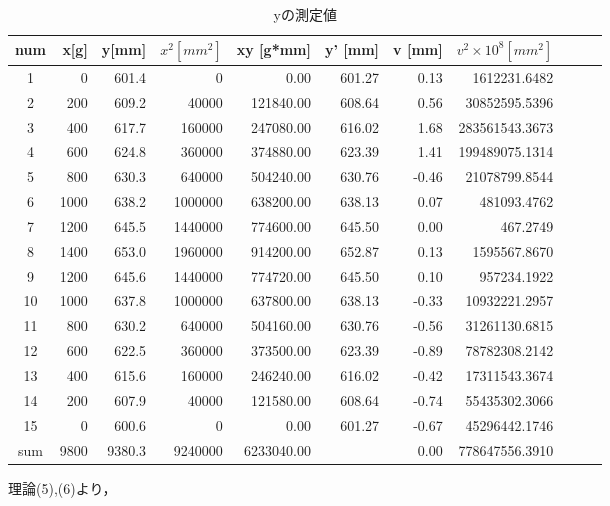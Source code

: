 \documentclass[a4paper,1pt]{jsarticle}
\begin{document}
\begin{table}[H]
  \caption{yの測定値}
  \label{table:SpeedOfLight}
  \centering
  \begin{tabular}{|c||r|r|r|r|r|r|r|r|r|r|}
    \hline
    num & x[g] & y[mm] & $x^2 [mm^2]$ & xy [g*mm] & y' [mm] & v [mm] & $v^2\times10^8 [mm^2]$ \\
    \hline\hline
    1 & 0 & 601.4 & 0 & 0.00 & 601.27 & 0.13 & 1612231.6482 \\
    2 & 200 & 609.2 & 40000 & 121840.00 & 608.64 & 0.56 & 30852595.5396 \\
    3 & 400 & 617.7 & 160000 & 247080.00 & 616.02 & 1.68 & 283561543.3673 \\
    4 & 600 & 624.8 & 360000 & 374880.00 & 623.39 & 1.41 & 199489075.1314 \\
    5 & 800 & 630.3 & 640000 & 504240.00 & 630.76 & -0.46 & 21078799.8544 \\
    6 & 1000 & 638.2 & 1000000 & 638200.00 & 638.13 & 0.07 & 481093.4762 \\
    7 & 1200 & 645.5 & 1440000 & 774600.00 & 645.50 & 0.00 & 467.2749 \\
    8 & 1400 & 653.0 & 1960000 & 914200.00 & 652.87 & 0.13 & 1595567.8670 \\
    9 & 1200 & 645.6 & 1440000 & 774720.00 & 645.50 & 0.10 & 957234.1922 \\
    10 & 1000 & 637.8 & 1000000 & 637800.00 & 638.13 & -0.33 & 10932221.2957 \\
    11 & 800 & 630.2 & 640000 & 504160.00 & 630.76 & -0.56 & 31261130.6815 \\
    12 & 600 & 622.5 & 360000 & 373500.00 & 623.39 & -0.89 & 78782308.2142 \\
    13 & 400 & 615.6 & 160000 & 246240.00 & 616.02 & -0.42 & 17311543.3674 \\
    14 & 200 & 607.9 & 40000 & 121580.00 & 608.64 & -0.74 & 55435302.3066 \\
    15 & 0 & 600.6 & 0 & 0.00 & 601.27 & -0.67 & 45296442.1746 \\

    \hline\hline
    sum & 9800 & 9380.3 & 9240000 & 6233040.00 &  & 0.00 & 778647556.3910 \\

    \hline
  \end{tabular}


\end{table}

理論(5),(6)より，\\
\end{document}
